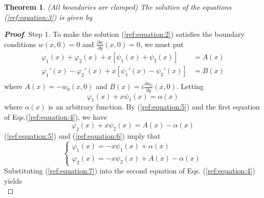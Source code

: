 \documentclass[a4paper]{article}      %
\begin{document}
\newtheorem{theorem}{Theorem}[section]
\begin{theorem}                                                             %
  (All boundaries are clamped) The solution of the equations (\textnormal{\ref{ref:equation:3}})
is given by
\end{theorem}
\begin{proof}[{\bf Proof}]%
\item[\quad Step 1.] To make the solution (\ref{ref:equation:2}) satisfies the boundary conditions $w(x,0)=0$ and $\frac{\partial w}{\partial y}(x,0)=0$, we must put
         \begin{equation}\label{ref:equation:4}                                 %
         \begin{split}
         \varphi_{1}(x)+\varphi_{2}(x)+x[\psi_{1}(x)+\psi_{2}(x)]&=A(x)\\
         \varphi_{1}'(x)-\varphi_{2}'(x)+x[\psi_{1}'(x)-\psi_{2}'(x)]&=B(x)\\
         \end{split}
         \end{equation}
    where $A(x)=-w_{0}(x,0)$ and $B(x)=i\frac{\displaystyle \partial w_{0}}{\displaystyle \partial y}(x,0)$. Letting
         \begin{equation}\label{ref:equation:5}                                 %
           \varphi_{1}(x)+x\psi_{1}(x)=\alpha(x)
         \end{equation}
    where $\alpha(x)$ is an arbitrary function. By (\ref{ref:equation:5}) and the first equation of Eqs.(\ref{ref:equation:4}), we have
         \begin{equation}\label{ref:equation:6}                                 %
          \varphi_{2}(x)+x\psi_{2}(x)=A(x)-\alpha(x)
         \end{equation}
    (\ref{ref:equation:5}) and (\ref{ref:equation:6}) imply that
         \begin{equation}\label{ref:equation:7}                                 %
         \left\{ {\begin{array}{*{20}{l}}
         {\varphi_{1}(x)=-x\psi_{1}(x)+\alpha(x)}\\
         {\varphi_{2}(x)=-x\psi_{2}(x)+A(x)-\alpha(x)}
         \end{array}} \right.
         \end{equation}
    Substituting (\ref{ref:equation:7}) into the second equation of Eqs. (\ref{ref:equation:4}) yields
        \begin{equation}\label{ref:equation:8}                                  %

\end{equation}
\end{proof}
\end{document}
